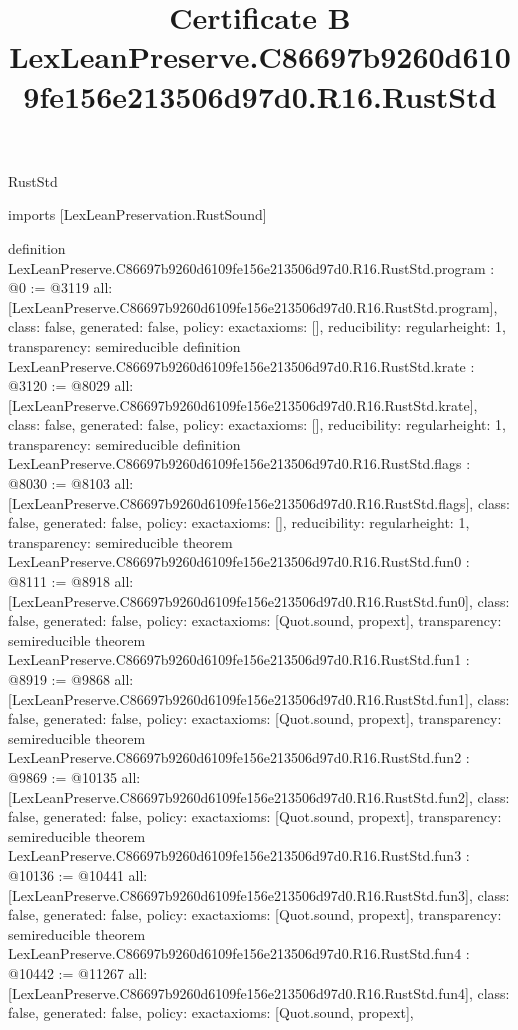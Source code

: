 \begin{lexlean}{RustStd}
\title{Certificate B LexLeanPreserve.C86697b9260d6109fe156e213506d97d0.R16.RustStd}
\begin{coremodule}
imports [LexLeanPreservation.RustSound]

definition LexLeanPreserve.C86697b9260d6109fe156e213506d97d0.R16.RustStd.program : @0 := @3119 {
  all: [LexLeanPreserve.C86697b9260d6109fe156e213506d97d0.R16.RustStd.program],
  class: false,
  generated: false,
  policy: exact{axioms: []},
  reducibility: regular{height: 1},
  transparency: semireducible
}
definition LexLeanPreserve.C86697b9260d6109fe156e213506d97d0.R16.RustStd.krate : @3120 := @8029 {
  all: [LexLeanPreserve.C86697b9260d6109fe156e213506d97d0.R16.RustStd.krate],
  class: false,
  generated: false,
  policy: exact{axioms: []},
  reducibility: regular{height: 1},
  transparency: semireducible
}
definition LexLeanPreserve.C86697b9260d6109fe156e213506d97d0.R16.RustStd.flags : @8030 := @8103 {
  all: [LexLeanPreserve.C86697b9260d6109fe156e213506d97d0.R16.RustStd.flags],
  class: false,
  generated: false,
  policy: exact{axioms: []},
  reducibility: regular{height: 1},
  transparency: semireducible
}
theorem LexLeanPreserve.C86697b9260d6109fe156e213506d97d0.R16.RustStd.fun0 : @8111 := @8918 {
  all: [LexLeanPreserve.C86697b9260d6109fe156e213506d97d0.R16.RustStd.fun0],
  class: false,
  generated: false,
  policy: exact{axioms: [Quot.sound, propext]},
  transparency: semireducible
}
theorem LexLeanPreserve.C86697b9260d6109fe156e213506d97d0.R16.RustStd.fun1 : @8919 := @9868 {
  all: [LexLeanPreserve.C86697b9260d6109fe156e213506d97d0.R16.RustStd.fun1],
  class: false,
  generated: false,
  policy: exact{axioms: [Quot.sound, propext]},
  transparency: semireducible
}
theorem LexLeanPreserve.C86697b9260d6109fe156e213506d97d0.R16.RustStd.fun2 : @9869 := @10135 {
  all: [LexLeanPreserve.C86697b9260d6109fe156e213506d97d0.R16.RustStd.fun2],
  class: false,
  generated: false,
  policy: exact{axioms: [Quot.sound, propext]},
  transparency: semireducible
}
theorem LexLeanPreserve.C86697b9260d6109fe156e213506d97d0.R16.RustStd.fun3 : @10136 := @10441 {
  all: [LexLeanPreserve.C86697b9260d6109fe156e213506d97d0.R16.RustStd.fun3],
  class: false,
  generated: false,
  policy: exact{axioms: [Quot.sound, propext]},
  transparency: semireducible
}
theorem LexLeanPreserve.C86697b9260d6109fe156e213506d97d0.R16.RustStd.fun4 : @10442 := @11267 {
  all: [LexLeanPreserve.C86697b9260d6109fe156e213506d97d0.R16.RustStd.fun4],
  class: false,
  generated: false,
  policy: exact{axioms: [Quot.sound, propext]},
}
\end{coremodule}
\end{lexlean}
